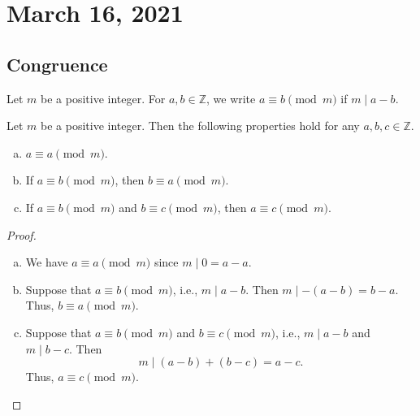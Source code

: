 \documentclass[11pt]{article}
\newcommand{\ZZ}{\mathbb{Z}}
\begin{document}
\section{March 16, 2021}
\subsection{Congruence}
\begin{definition}
  Let $m$ be a positive integer.
  For $a, b \in \ZZ$, we write $a \equiv b \pmod m$ if $m \mid a - b$.
\end{definition}

\begin{proposition}
  Let $m$ be a positive integer.
  Then the following properties hold for any $a, b, c \in \ZZ$.
  \begin{enumerate}[(a)]
    \item $a \equiv a \pmod m$.
    \item If $a \equiv b \pmod m$, then $b \equiv a \pmod m$.
    \item If $a \equiv b \pmod m$ and $b \equiv c \pmod m$, then $a \equiv c \pmod m$.
  \end{enumerate}
\end{proposition}
\begin{proof}
  \leavevmode
  \begin{enumerate}[(a)]
    \item We have $a \equiv a \pmod m$ since $m \mid 0 = a - a$.
    \item Suppose that $a \equiv b \pmod m$, i.e., $m \mid a - b$.
    Then $m \mid -(a - b) = b - a$.
    Thus, $b \equiv a \pmod m$.
    \item Suppose that $a \equiv b \pmod m$ and $b \equiv c \pmod m$, i.e., $m \mid a - b$ and $m \mid b - c$.
    Then
    \begin{equation*}
      m \mid (a - b) + (b - c) = a - c.
    \end{equation*}
    Thus, $a \equiv c \pmod m$.
    \qedhere
  \end{enumerate}
\end{proof}
\end{document}
